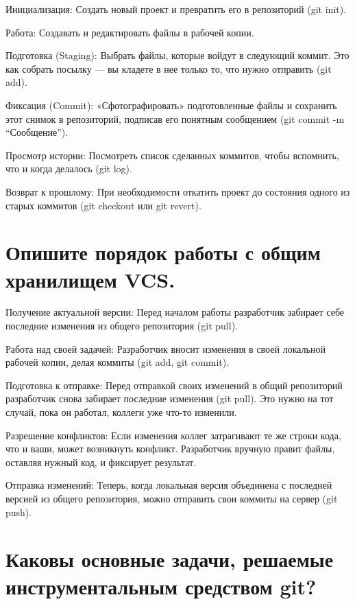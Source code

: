 \documentclass[
  english,
  russian,
  12pt,
  a4paper,
  DIV=11,
  numbers=noendperiod]{scrreprt}
\begin{document}
Инициализация: Создать новый проект и превратить его в репозиторий (git
init).

Работа: Создавать и редактировать файлы в рабочей копии.

Подготовка (Staging): Выбрать файлы, которые войдут в следующий коммит.
Это как собрать посылку --- вы кладете в нее только то, что нужно
отправить (git add).

Фиксация (Commit): «Сфотографировать» подготовленные файлы и сохранить
этот снимок в репозиторий, подписав его понятным сообщением (git commit
-m \enquote{Сообщение}).

Просмотр истории: Посмотреть список сделанных коммитов, чтобы вспомнить,
что и когда делалось (git log).

Возврат к прошлому: При необходимости откатить проект до состояния
одного из старых коммитов (git checkout или git revert).

\section{Опишите порядок работы с общим хранилищем
VCS.}\label{ux43eux43fux438ux448ux438ux442ux435-ux43fux43eux440ux44fux434ux43eux43a-ux440ux430ux431ux43eux442ux44b-ux441-ux43eux431ux449ux438ux43c-ux445ux440ux430ux43dux438ux43bux438ux449ux435ux43c-vcs.}

Получение актуальной версии: Перед началом работы разработчик забирает
себе последние изменения из общего репозитория (git pull).

Работа над своей задачей: Разработчик вносит изменения в своей локальной
рабочей копии, делая коммиты (git add, git commit).

Подготовка к отправке: Перед отправкой своих изменений в общий
репозиторий разработчик снова забирает последние изменения (git pull).
Это нужно на тот случай, пока он работал, коллеги уже что-то изменили.

Разрешение конфликтов: Если изменения коллег затрагивают те же строки
кода, что и ваши, может возникнуть конфликт. Разработчик вручную правит
файлы, оставляя нужный код, и фиксирует результат.

Отправка изменений: Теперь, когда локальная версия объединена с
последней версией из общего репозитория, можно отправить свои коммиты на
сервер (git push).

\section{Каковы основные задачи, решаемые инструментальным средством
git?}\label{ux43aux430ux43aux43eux432ux44b-ux43eux441ux43dux43eux432ux43dux44bux435-ux437ux430ux434ux430ux447ux438-ux440ux435ux448ux430ux435ux43cux44bux435-ux438ux43dux441ux442ux440ux443ux43cux435ux43dux442ux430ux43bux44cux43dux44bux43c-ux441ux440ux435ux434ux441ux442ux432ux43eux43c-git}
\end{document}
